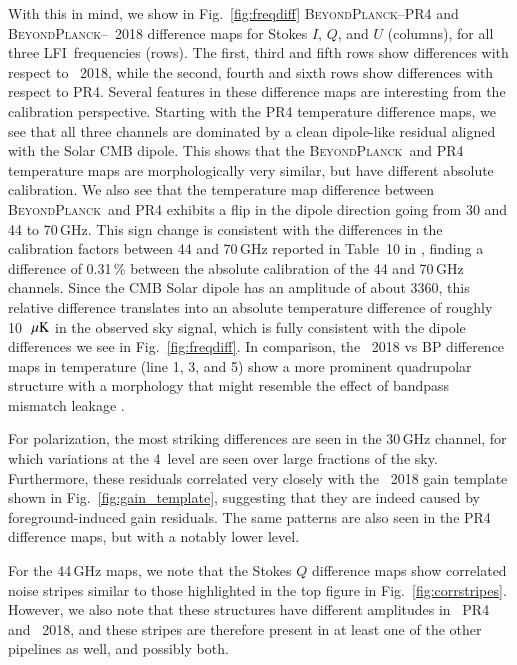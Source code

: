 \documentclass[twocolumn]{aa}
\newcommand{\BP}{\textsc{BeyondPlanck}}
\newcommand{\lfi}[0]{LFI}
\begin{document}
With this in mind, we show in Fig.~\ref{fig:freqdiff} \BP--PR4 and
\BP--\Planck\ 2018 difference maps for Stokes $I$, $Q$, and $U$
(columns), for all three \lfi\ frequencies (rows). The first, third
and fifth rows show differences with respect to \Planck\ 2018, while
the second, fourth and sixth rows show differences with respect to
PR4. Several features in these difference maps are interesting from
the calibration perspective. Starting with the PR4 temperature
difference maps, we see that all three channels are dominated by a
clean dipole-like residual aligned with the Solar CMB dipole. This
shows that the \BP\ and PR4 temperature maps are morphologically
very similar, but have different absolute calibration. We also see
that the temperature map difference between \BP\ and PR4 exhibits
a flip in the dipole direction going from 30 and 44 to 70\,GHz. This
sign change is consistent with the differences in the calibration
factors between 44 and 70\,GHz reported in Table~10 in
\citet{planck2020-LVII}, finding a difference of 0.31\,\% between the
absolute calibration of the 44 and 70\,GHz channels. Since the CMB
Solar dipole has an amplitude of about 3360\muK, this relative
difference translates into an absolute temperature difference of
roughly 10~$\muK$ in the observed sky signal, which is fully
consistent with the dipole differences we see in
Fig.~\ref{fig:freqdiff}. In comparison, the \Planck\ 2018 
vs BP difference maps in temperature (line 1, 3, and 5) show a more prominent
quadrupolar structure with a morphology that might resemble the effect of
bandpass mismatch leakage \citep{planck2014-a12,planck2020-LVII}.



For polarization, the most striking differences are seen in the
30\,GHz channel, for which variations at the 4\muK\ level are seen
over large fractions of the sky. Furthermore, these residuals
correlated very closely with the \Planck\ 2018 gain template shown in
Fig.~\ref{fig:gain_template}, suggesting that they are indeed caused
by foreground-induced gain residuals. The same patterns are also seen
in the PR4 difference maps, but with a notably lower level.

For the 44\,GHz maps, we note that the Stokes $Q$ difference
maps show correlated noise stripes similar to those highlighted in
the top figure in Fig.~\ref{fig:corrstripes}. However, we also note that these
structures have different amplitudes in \Planck\ PR4 and \Planck\ 2018,
and these stripes are therefore present in at least one of the other
pipelines as well, and possibly both. 
\end{document}
